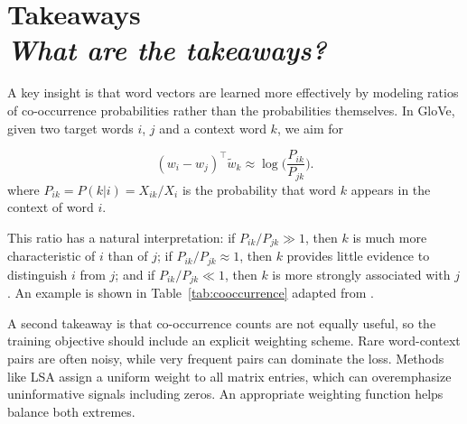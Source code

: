\documentclass[10pt,a4paper]{article}
\begin{document}
\section{\textbf{Takeaways} \\ \textit{What are the takeaways?}}
A key insight is that word vectors are learned more effectively by modeling ratios of co-occurrence probabilities rather than the probabilities themselves. In GloVe, given two target words $i$, $j$ and a context word $k$, we aim for

\begin{equation}
    (w_i - w_j)^\top \tilde{w}_k \approx \log\bigg(\frac{P_{ik}}{P_{jk}}\bigg).
\end{equation}
where $P_{ik} = P(k|i) = X_{ik}/X_i$ is the probability that word $k$ appears in the context of word $i$.

This ratio has a natural interpretation: if $P_{ik}/P_{jk} \gg 1$, then $k$ is much more characteristic of $i$ than of $j$; if $P_{ik}/P_{jk} \approx 1$, then $k$ provides little evidence to distinguish $i$ from $j$; and if $P_{ik}/P_{jk} \ll 1$, then $k$ is more strongly associated with $j$. An example is shown in Table~\ref{tab:cooccurrence} adapted from \cite{glove2014}.

\begin{table}[!htbp]
\centering
\renewcommand{\arraystretch}{1.2}
\caption{Co-occurrence probabilities for target words \textit{ice} and \textit{steam} with selected context words.}
\label{tab:cooccurrence}
\end{table}

A second takeaway is that co-occurrence counts are not equally useful, so the training objective should include an explicit weighting scheme. Rare word-context pairs are often noisy, while very frequent pairs can dominate the loss. Methods like LSA assign a uniform weight to all matrix entries, which can overemphasize uninformative signals including zeros. An appropriate weighting function helps balance both extremes.
\end{document}
